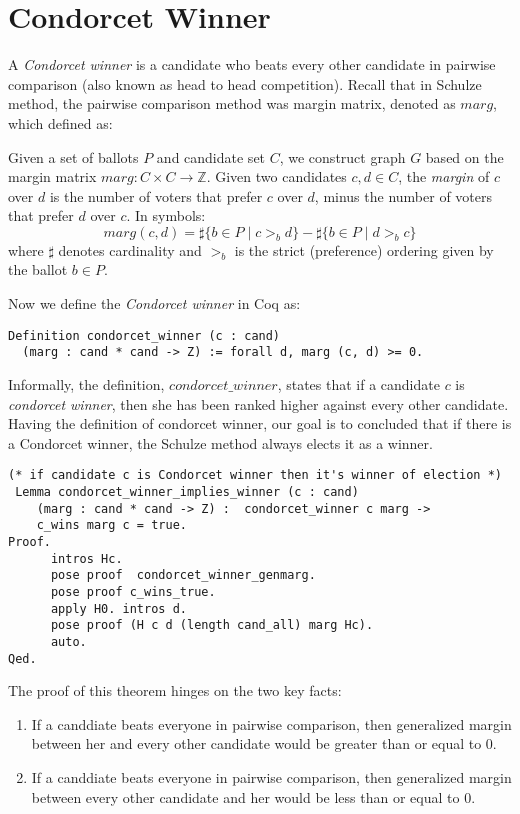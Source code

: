  \section{Condorcet Winner}
	A \textit{Condorcet winner} is a candidate who beats every other candidate in pairwise comparison (also known as head to head competition). 
	Recall that in Schulze method, the pairwise comparison method was margin matrix, denoted as $marg$, which defined as:
	\begin{displayquote}
	Given a set of ballots $P$ and candidate set $C$, we construct graph $G$ based on the margin matrix $marg: C \times C \to \mathbb{Z}$. Given two candidates $c, d \in C$,
the \emph{margin} of $c$ over $d$ is
the number of voters that prefer $c$ over $d$, minus the number of voters that prefer $d$ over $c$. 
In symbols:
\[
  marg(c, d) = \sharp \lbrace b \in P \mid c >_b d \rbrace -
            \sharp \lbrace b \in P \mid d >_b c \rbrace
\] where $\sharp$ denotes cardinality and $>_b$ is the strict
(preference) ordering given by the ballot $b \in P$.
 
 \end{displayquote}
  
\noindent	 
Now we define the \textit{Condorcet winner} in Coq as:
 \begin{verbatim}
Definition condorcet_winner (c : cand) 
  (marg : cand * cand -> Z) := forall d, marg (c, d) >= 0.
\end{verbatim}

  Informally, the definition,  $condorcet\_winner$, states that 
  if a candidate $c$  is \textit{condorcet winner}, then she has been ranked higher against
  every other candidate.  Having the definition of  condorcet winner, our goal is to concluded that if there is 
 	a Condorcet winner, the Schulze method always elects it as a winner.  
 	
\begin{verbatim}
(* if candidate c is Condorcet winner then it's winner of election *)
 Lemma condorcet_winner_implies_winner (c : cand) 
    (marg : cand * cand -> Z) :  condorcet_winner c marg ->
    c_wins marg c = true. 
Proof.
      intros Hc. 
      pose proof  condorcet_winner_genmarg.
      pose proof c_wins_true.
      apply H0. intros d.
      pose proof (H c d (length cand_all) marg Hc).
      auto.
Qed.
\end{verbatim}
 		
 The proof of this theorem hinges on the two key facts:
 \begin{enumerate}
  \item If a canddiate beats everyone in pairwise comparison, then generalized margin between her and every other candidate would 
      be  greater than or equal to 0.
  \item If a canddiate beats everyone in pairwise comparison, then generalized margin between every other candidate and her would 
      be  less than or equal to 0.
 \end{enumerate}
 
